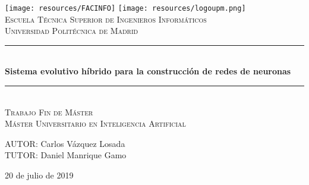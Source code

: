 \documentclass[a4paper,12pt,twoside]{report}
\begin{document}
  \begin{titlepage}
    \newcommand{\HRule}{\rule{\linewidth}{0.5mm}}
    \begin{center}
      \texttt{[image: resources/FACINFO]}
      \hspace{8cm}
      \texttt{[image: resources/logoupm.png]}
      \\[1cm]

      \textsc{\Large Escuela Técnica Superior de Ingenieros Informáticos}
      \\[0.5cm]
      \textsc{\large Universidad Politécnica de Madrid}
      \\[3cm]

      \HRule \\[0.4cm]
      {\huge \bfseries Sistema evolutivo híbrido para la construcción de redes de neuronas}
      \HRule \\[4cm]
    
      \textsc{\LARGE Trabajo Fin de Máster}\\[0.5cm]
      \textsc{\Large Máster Universitario en Inteligencia Artificial}\\[3cm]
    \end{center}
    \begin{flushright}
      \large AUTOR: Carlos Vázquez Losada \\TUTOR: Daniel Manrique Gamo
      \\[2.1cm]
    \end{flushright}
    \begin{center}
      {{20 de julio de 2019}}
    \end{center}
    \vfill
  \end{titlepage}

  \lipsum[1-15]
\end{document}
